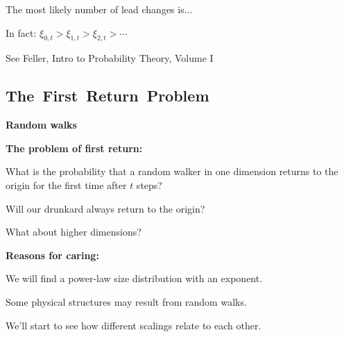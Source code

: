       The most likely number of lead changes is...  
      {}
    
      In fact:
      $\xi_{0,t} > \xi_{1,t} > \xi_{2,t} > \cdots $
    
    
    {\small See Feller, Intro to Probability Theory, Volume I\cite{feller1968a}} 
  




\subsection{The\ First\ Return\ Problem}

  \textbf{Random walks \hfill {}}

  \textbf{The problem of first return:}
    
     
      What is the probability that a random walker
      in one dimension returns to the origin
      for the first time after $t$ steps?
     
      Will our drunkard always return to the origin?
     
      What about higher dimensions?
    
  

  \textbf{Reasons for caring:}
    
     
      We will find a power-law size distribution
      with an  exponent.
     
      Some physical structures may result from random walks.
     
      We'll start to see how different scalings relate to each other.
    
  





